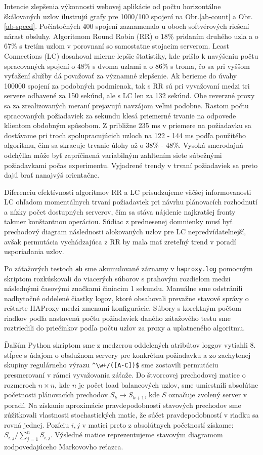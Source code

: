 \documentclass[12pt, a4paper]{article}
\begin{document}
Intencie zlepšenia výkonnosti webovej aplikácie od počtu horizontálne škálovaných uzlov ilustrujú
grafy pre 1000/100 spojení na Obr.\ref{ab-count} a Obr.\ref{ab-speed}. Počiatočných 400 spojení 
zaznamenalo u oboch softvérových riešení nárast obsluhy. Algoritmom Round Robin (RR) o 18\% pridaním 
druhého uzla a o 67\% s tretím uzlom v porovnaní so samostatne stojacim serverom. Least Connections (LC)
dosahoval mierne lepšie štatistiky, kde prišlo k navýšeniu počtu spracovaných spojení o 48\% 
s dvoma uzlami a o 86\% s troma, čo sa pri vyššom vyťažení služby dá považovať za významné zlepšenie.
Ak berieme do úvahy 100000 spojení za podobných podmienok, tak s RR sú pri vyvažovaní medzi tri servere
odbavené za 150 sekúnd, ale s LC len za 132 sekúnd. Obe reverzné proxy sa za zrealizovaných meraní prejavujú 
navzájom veľmi podobne. Rastom počtu spracovaných požiadaviek za sekundu klesá priemerné trvanie na odpovede 
klientom obdobným spôsobom. Z približne 235 ms v priemere na požiadavku sa dostávame pri troch 
spolupracujúcich uzloch na 122 - 144 ms podľa použitého algoritmu, čím sa skracuje trvanie úlohy až o
38\% - 48\%. Vysoká smerodajná odchýlka môže byť zapríčinená variabilným zahltením siete súbežnými 
požiadavkami počas experimentu. Vyjadrené trendy v trvaní požiadaviek sa preto dajú brať nanajvýš orientačne.


Diferenciu efektívnosti algoritmov RR a LC prisudzujeme väčšej informovanosti LC ohľadom
momentálnych trvaní požiadaviek pri návrhu plánovacích rozhodnutí a nízky počet dostupných serverov, 
čím sa stáva nájdenie najkratšej fronty takmer konštantnou operáciou. Súdiac z prednesenej
domnienky musí byť prechodový diagram následnosti alokovaných uzlov pre LC nepredvídateľnejší, 
avšak permutácia vychádzajúca z RR by mala mať zreteľný trend v poradí usporiadania uzlov.

Po záťažových testoch \verb|ab| sme akumulované záznamy v \verb|haproxy.log| pomocným skriptom
rozkúskovali do viacerých súborov s prahovým rozdielom medzi následnými časovými značkami činiacim
1 sekundu. Manuálne sme odstránili nadbytočné oddelené čiastky logov, ktoré obsahovali prevažne
stavové správy o reštarte HAProxy medzi zmenami konfigurácie. Súbory s korektným počtom riadkov
podľa nastavenú počtu požiadaviek daného zátažového testu sme roztriedili do priečinkov podľa
počtu uzlov za proxy a uplatneného algoritmu.

Ďalším Python skriptom sme z medzerou oddelených atribútov loggov vytiahli 8. stĺpec s údajom o obslužnom 
servery pre konkrétnu požiadavku a zo zachytenej skupiny regulárneho výrazu \verb|^\w+/([A-C])$| sme 
zostavili permutáciu presmerovaní v rámci vyvažovania záťaže. Do štvorcovej prechodovej matice o rozmeroch $n 
\times n$, kde $n$ je počet load balancových uzlov, sme umiestnili absolútne početnosti plánovacích prechodov 
$S_k\rightarrow S_{k+1}$, kde $S$ označuje zvolený server v poradí. Na získanie aproximácie pravdepodobností
stavových prechodov sme zúžitkovali vlastnosti stochastických matíc, že súčet pravdepodobností v riadku sa 
rovná jednej. Pozíciu $i,j$ v matici preto z absolútnych početností získame: 
$S_{i,j} / \sum_{j=1}^{n}{S_{i,j}}$. Výsledné matice reprezentujeme stavovým diagramom zodpovedajúceho
Markovovho reťazca.
\end{document}
